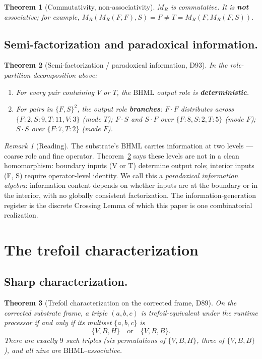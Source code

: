 \documentclass[11pt,reqno]{amsart}
\theoremstyle{plain}
\newtheorem{theorem}{Theorem}[section]
\theoremstyle{definition}
\theoremstyle{remark}
\newtheorem*{remark}{Remark}
\newcommand{\BH}{\mathrm{BHML}}
\begin{document}
\begin{theorem}[Commutativity, non-associativity]
\label{thm:role-magma-non-assoc}
$M_{R}$ is commutative. It is \textbf{not} associative; for example,
$M_{R}(M_{R}(F, F), S) = F \neq T = M_{R}(F, M_{R}(F, S))$.
\end{theorem}

\subsection{Semi-factorization and paradoxical information.}
\begin{theorem}[Semi-factorization / paradoxical information, D93]
\label{thm:semi-fact}
In the role-partition decomposition above:
\begin{enumerate}
\item For every pair containing $V$ or $T$, the $\BH$ output role is
\textbf{deterministic}.
\item For pairs in $\{F, S\}^{2}$, the output role \textbf{branches}:
$F \cdot F$ distributes across $\{F: 2, S: 9, T: 11, V: 3\}$ (mode
$T$); $F \cdot S$ and $S \cdot F$ over $\{F: 8, S: 2, T: 5\}$ (mode
$F$); $S \cdot S$ over $\{F: 7, T: 2\}$ (mode $F$).
\end{enumerate}
\end{theorem}

\begin{remark}[Reading]
The substrate's $\BH$ carries information at two levels --- coarse
role and fine operator. Theorem~\ref{thm:semi-fact} says these levels
are not in a clean homomorphism: boundary inputs (V or T) determine
output role; interior inputs (F, S) require operator-level identity.
We call this a \emph{paradoxical information algebra}: information
content depends on whether inputs are at the boundary or in the
interior, with no globally consistent factorization. The
information-generation register is the discrete Crossing Lemma
\cite{SandersMayesCL} of which this paper is one combinatorial
realization.
\end{remark}

\section{The trefoil characterization}

\subsection{Sharp characterization.}
\begin{theorem}[Trefoil characterization on the corrected frame, D89]
\label{thm:trefoil-characterization}
On the corrected substrate frame, a triple $(a, b, c)$ is
trefoil-equivalent under the runtime processor if and only if its
multiset $\{a, b, c\}$ is
\[
  \{V, B, H\} \quad\text{or}\quad \{V, B, B\}.
\]
There are exactly $9$ such triples (six permutations of $\{V, B, H\}$,
three of $\{V, B, B\}$), and all nine are $\BH$-associative.
\end{theorem}
\end{document}
